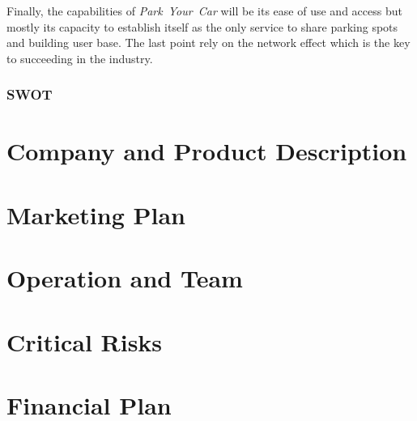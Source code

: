 \documentclass[12pt,a4paper,oneside]{book}
\newcommand{\bp}{\textit{Park~Your~Car }}
\begin{document}
Finally, the capabilities of \bp will be its ease of use and access but mostly its capacity to establish itself as the only service to share parking spots and building user base. The last point rely on the network effect which is the key to succeeding in the industry.

\subsection{SWOT}

\chapter{Company and Product Description}

\chapter{Marketing Plan}

\chapter{Operation and Team}

\chapter{Critical Risks}

\chapter{Financial Plan}



%

\end{document}
